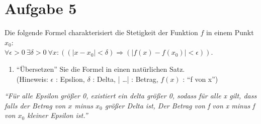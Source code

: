 \section*{Aufgabe 5}

Die folgende Formel charakterisiert die Stetigkeit der Funktion $f$ in einem Punkt $x_0$:\\
$\forall \epsilon > 0 \ \exists \delta > 0 \ \forall  x : ((| x - x_0 | < \delta) \Rightarrow (| f(x) - f(x_0)| < \epsilon))$.

\begin{enumerate}[label={a)}, leftmargin=*]
\item ``Übersetzen'' Sie die Formel in einen natürlichen Satz.\\
(Hineweis: $\epsilon$ : Epslion, $\delta$ : Delta, | \dots | : Betrag, $f(x)$ : ``f von x'')
\end{enumerate}

\textit{``Für alle Epsilon größer 0, existiert ein delta größer 0, sodass für alle x gilt, dass falls der Betrag von $x$ minus $x_0$ größer Delta ist, Der Betrag von f von x minus f von $x_0$ kleiner Epsilon ist.''}